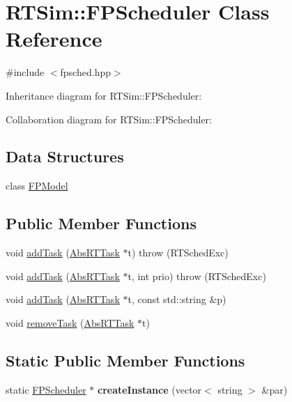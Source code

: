 \hypertarget{classRTSim_1_1FPScheduler}{}\section{R\+T\+Sim\+:\+:F\+P\+Scheduler Class Reference}
\label{classRTSim_1_1FPScheduler}


{\ttfamily \#include $<$fpsched.\+hpp$>$}



Inheritance diagram for R\+T\+Sim\+:\+:F\+P\+Scheduler\+:


Collaboration diagram for R\+T\+Sim\+:\+:F\+P\+Scheduler\+:
\subsection*{Data Structures}
\begin{DoxyCompactItemize}
\item 
class \hyperlink{classRTSim_1_1FPScheduler_1_1FPModel}{F\+P\+Model}
\end{DoxyCompactItemize}
\subsection*{Public Member Functions}
\begin{DoxyCompactItemize}
\item 
void \hyperlink{classRTSim_1_1FPScheduler_af54f75a969ebae49b8faa63ce3169ea4}{add\+Task} (\hyperlink{classRTSim_1_1AbsRTTask}{Abs\+R\+T\+Task} $\ast$t)  throw (\+R\+T\+Sched\+Exc)
\item 
void \hyperlink{classRTSim_1_1FPScheduler_aad24783587ff6119170573dcade2ef28}{add\+Task} (\hyperlink{classRTSim_1_1AbsRTTask}{Abs\+R\+T\+Task} $\ast$t, int prio)  throw (\+R\+T\+Sched\+Exc)
\item 
void \hyperlink{classRTSim_1_1FPScheduler_a540c6b71c265234d6713ab1392cf1ef6}{add\+Task} (\hyperlink{classRTSim_1_1AbsRTTask}{Abs\+R\+T\+Task} $\ast$t, const std\+::string \&p)
\item 
void \hyperlink{classRTSim_1_1FPScheduler_abd92339de6b7580663a2da01f2eff683}{remove\+Task} (\hyperlink{classRTSim_1_1AbsRTTask}{Abs\+R\+T\+Task} $\ast$t)
\end{DoxyCompactItemize}
\subsection*{Static Public Member Functions}
\begin{DoxyCompactItemize}
\item 
static \hyperlink{classRTSim_1_1FPScheduler}{F\+P\+Scheduler} $\ast$ {\bfseries create\+Instance} (vector$<$ string $>$ \&par)\hypertarget{classRTSim_1_1FPScheduler_aaf59177e22f266069a388023906d9058}{}\label{classRTSim_1_1FPScheduler_aaf59177e22f266069a388023906d9058}

\end{DoxyCompactItemize}
